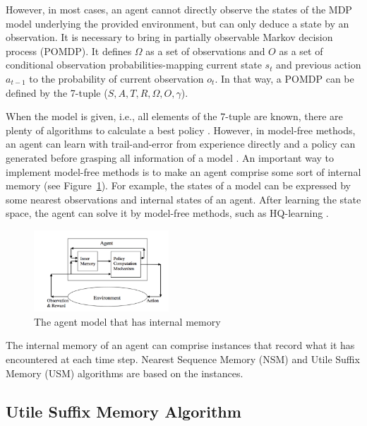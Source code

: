 \documentclass{article}
\begin{document}
However, in most cases, an agent cannot directly observe the states of the MDP
model underlying the provided environment, but can only deduce a state by an
observation. It is necessary to bring in partially observable Markov decision
process (POMDP). It defines $\Omega$ as a set of observations and $O$ as a set of
conditional observation probabilities-mapping current state $s_t$ and
previous action $a_{t-1}$ to the probability of current observation $o_t$. 
In that way, a POMDP can be defined by the 7-tuple ($S, A, T, R, \Omega, O, \gamma$).

When the model is given, i.e., all elements of the 7-tuple are known, there are
plenty of algorithms to calculate a best policy \cite{shani2013survey}. However,
in model-free methods, an agent can learn with trail-and-error from experience
directly and a policy can generated before grasping all information of a model
\cite{li2017deep}. An important way to implement model-free methods is to make
an agent comprise some sort of internal memory \cite{aberdeen2003policy,
meuleau1999learning,mccallum1995instance} (see Figure~\ref{fig:agent memory}).
For example, the states of a model can be expressed by some nearest observations
and internal states of an agent. After learning the state space, the agent can solve it by 
model-free methods, such as HQ-learning \cite{wiering1997hq}.

\begin{figure}[b]
  \centering
    \includegraphics[width=0.45\textwidth]{agent_with_memory.png}
  \caption{The agent model that has internal memory}
  \label{fig:agent memory}
\end{figure}

The internal memory of an agent can comprise instances that record what it has
encountered at each time step. Nearest Sequence Memory (NSM) and Utile
Suffix Memory (USM) algorithms are based on the instances.


\subsection{Utile Suffix Memory Algorithm}
\end{document}
